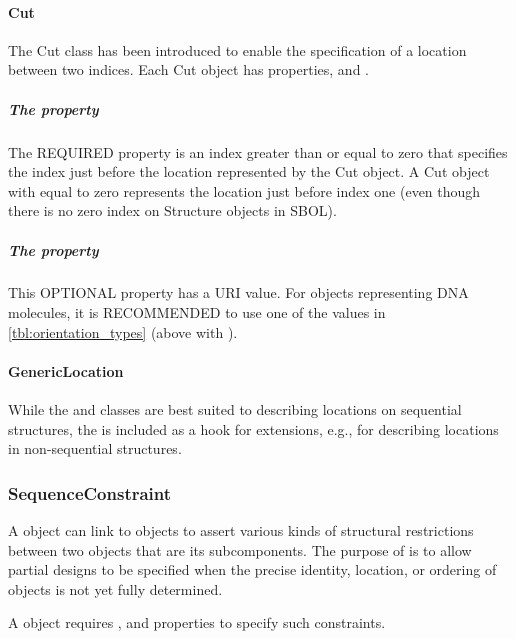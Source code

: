 \paragraph{Cut}
\label{sec:Cut}
The Cut class has been introduced to enable the specification of a location between two indices. 
Each Cut object has properties,  and .

\subparagraph{The  property}

The REQUIRED  property is an index greater than or equal to zero that specifies the index just before the location represented by the Cut object. 
A Cut object with  equal to zero represents the location just before index one (even though there is no zero index on Structure objects in SBOL). 

\subparagraph{The  property}
This OPTIONAL property has a URI value. For  objects representing DNA molecules, it is RECOMMENDED to use one of the values in \ref{tbl:orientation_types} (above with ).


\paragraph{GenericLocation}
\label{sec:GenericLocation}

While the  and  classes are best suited to
describing locations on sequential structures, the
 is included as a hook for extensions, e.g., for
describing locations in non-sequential structures.


\subsubsection{SequenceConstraint}
\label{sec:SequenceConstraint}
A  object can link to  objects to assert various kinds of structural restrictions between two  objects that are its subcomponents. 
The purpose of  is to allow partial designs to be specified when the precise identity, location, or ordering of  objects is not yet fully determined.

A  object requires ,  and  properties to specify such constraints.

